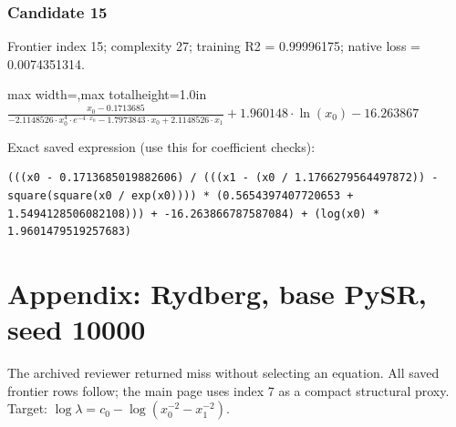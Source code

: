 \documentclass[10pt,letterpaper,landscape]{article}
\begin{document}
\subsubsection*{Candidate 15}
Frontier index 15; complexity 27; training R2 = 0.99996175; native loss = 0.0074351314.
\begin{center}\begin{adjustbox}{max width=\linewidth,max totalheight=1.0in}$\displaystyle \frac{x_{0} - 0.1713685}{- 2.1148526 \cdot x_{0}^{4} \cdot e^{- 4 \cdot x_{0}} - 1.7973843 \cdot x_{0} + 2.1148526 \cdot x_{1}} + 1.960148 \cdot \ln{\left(x_{0} \right)} - 16.263867$\end{adjustbox}\end{center}
{\scriptsize Exact saved expression (use this for coefficient checks):}
\begin{lstlisting}
(((x0 - 0.1713685019882606) / (((x1 - (x0 / 1.1766279564497872)) - square(square(x0 / exp(x0)))) * (0.5654397407720653 + 1.5494128506082108))) + -16.263866787587084) + (log(x0) * 1.9601479519257683)
\end{lstlisting}
\clearpage\section*{Appendix: Rydberg, base PySR, seed 10000}
The archived reviewer returned miss without selecting an equation. All saved frontier rows follow; the main page uses index 7 as a compact structural proxy. Target: $\log\lambda=c_0-\log(x_0^{-2}-x_1^{-2})$.
\end{document}
